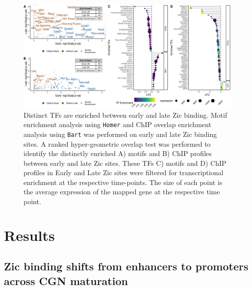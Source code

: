 \documentclass[fleqn,10pt]{wlscirep}
\begin{document}
\begin{figure}[!ht]
\centering
\includegraphics[width=.95\textwidth]{../figures/figure2.png}
\caption{ Distinct TFs are enriched between early and late Zic binding. Motif enrichment analysis using \texttt{Homer} and ChIP overlap enrichment analysis using \texttt{Bart} was performed on early and late Zic binding sites. A ranked hyper-geometric overlap test was performed to identify the distinctly enriched A) motifs and B) ChIP profiles between early and late Zic sites. These TFs C) motifs and D) ChIP profiles in Early and Late Zic sites were filtered for transcriptional enrichment at the respective time-points. The size of each point is the average expression of the mapped gene at the respective time point. }
\label{fig:DistinctTFs}
\end{figure}

\section*{Results}
\subsection*{Zic binding shifts from enhancers to promoters across CGN maturation} 
\end{document}

